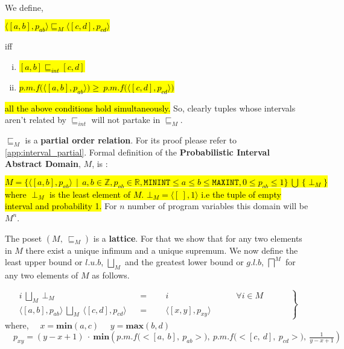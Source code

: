 \documentclass[final,3p, review, times]{util/elsarticle}
\begin{document}
We define,

\centerline{\hl{$\langle[a,b],p_{ab}\rangle\sqsubseteq_M\langle[c,d],p_{cd}\rangle$}}
iff
\begin{enumerate}[i)]
\item \hl{$[a,b]\sqsubseteq_{int}[c,d]$}
\item \hl{$p.m.f\Big(\langle[a,b],p_{ab}\rangle\Big)\geq\ p.m.f\Big(\langle[c,d],p_{cd}\rangle\Big)$}
\end{enumerate}
\hl{all the above conditions hold simultaneously.} So, clearly tuples whose intervals aren't related by $\sqsubseteq_{int}$ will not partake in $\sqsubseteq_M$.

$\sqsubseteq_M$ is a \textbf{partial order relation}. For its proof please refer to \ref{app:interval_partial}. Formal definition of the \textbf{Probabilistic Interval Abstract Domain}, $M$, is :

\hl{$M=\big\{\langle[a,b],p_{ab}\rangle\ \ |\ \ a,b\in\mathbb{Z}, p_{ab}\in\mathbb{R}, \mathtt{MININT}\leq a\leq b\leq\mathtt{MAXINT}, 0\leq p_{ab}\leq1\big\}\ \bigcup\ \big\{\perp_M\big\}$\\
where $\perp_M$ is the least element of $M$. $\bot_M=\langle[\ ],1\rangle$ i.e the tuple of empty interval and probability 1.} For $n$ number of program variables this domain will be $M^n$.

The poset $(M,\ \sqsubseteq_M)$ is a \textbf{lattice}. For that we show that for any two elements in $M$ there exist a unique infimum and a unique supremum. We now define the least upper bound or $l.u.b$, $\displaystyle\bigsqcup_M$ and the greatest lower bound or $g.l.b$, $\displaystyle\bigsqcap^M$ for any two elements of $M$ as follows.

\begin{equation}
\label{eq:lub_M}
 \left.\begin{aligned}
        i\ \bigsqcup_M\ \bot_M&&=&\quad\ \ i\qquad\qquad\qquad\qquad\text{$\forall i\in M$}\\
        \langle[a,b],p_{ab}\rangle\ \bigsqcup_M\ \langle[c,d],p_{cd}\rangle&&=&\quad\ \ \langle[x,y],p_{xy}\rangle\qquad\quad\qquad\qquad
       \end{aligned}\qquad
 \right\}
\end{equation}
where,
	$\quad x=\mathbf{min}(a,c)$
	$\quad y=\mathbf{max}(b,d)$
	$\quad\displaystyle p_{xy}=(y-x+1)\ \cdot\ \mathbf{min}\left(p.m.f\Big(\big<[a,\ b],\ p_{ab}\big>\Big),\ p.m.f\Big(\big<[c,\ d],\ p_{cd}\big>\Big),\ \frac{1}{y-x+1}\right)$
	
\end{document}
